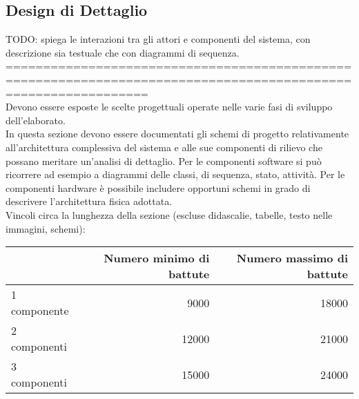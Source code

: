 \subsection*{Design di Dettaglio}
TODO: spiega le interazioni tra gli attori e componenti del sistema, con descrizione sia testuale che con diagrammi di sequenza.\\



=============================================================================================================== \\
Devono essere esposte le scelte progettuali operate nelle varie fasi di sviluppo dell'elaborato.\\

In questa sezione devono essere documentati gli schemi di progetto relativamente all'architettura complessiva del sistema e alle sue componenti di rilievo che possano meritare un'analisi di dettaglio. Per le componenti software si può ricorrere ad esempio a diagrammi delle classi, di sequenza, stato, attività. Per le componenti hardware è possibile includere opportuni schemi in grado di descrivere l'architettura fisica adottata.\\

Vincoli circa la lunghezza della sezione (escluse didascalie, tabelle, testo nelle immagini, schemi):

\vspace{1cm}
\begin{tabular}{l|rr}
 & Numero minimo di battute & Numero massimo di battute \\
 \hline
 1 componente & 9000 & 18000 \\
 2 componenti & 12000 & 21000 \\
 3 componenti & 15000 & 24000 \\
 \hline
\end{tabular}


\newpage